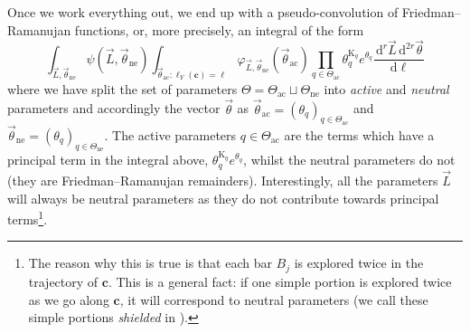 \documentclass[12pt,twoside]{article}
\theoremstyle{theorem}
\theoremstyle{remark}
\theoremstyle{definition}
\theoremstyle{example}
\renewcommand{\d}{\, \mathrm{d}}
\newcommand{\1}[1]{\mathds{1}_{#1}}
\newcommand{\rK}{\mathrm{K}}
\newcommand{\curve}{\mathbf{c}}
\newcommand{\thetaNe}{\vec{\theta}_{\mathrm{ne}}}
\newcommand{\thetaAc}{\vec{\theta}_{\mathrm{ac}}}
\begin{document}
Once we work everything out, we end up with a pseudo-convolution of Friedman--Ramanujan functions,
or, more precisely, an integral of the form
\begin{equation*}
  \int_{\vec{L}, \thetaNe} \psi(\vec{L},\thetaNe)
  \int_{\thetaAc: \ell_Y(\curve)=\ell} \varphi_{\vec{L},\thetaNe}(\thetaAc) \prod_{q \in \Theta_{\mathrm{ac}}} \theta_q^{\rK_q} e^{\theta_q}
  \frac{\d^r \vec{L} \d^{2r} \vec{\theta}}{\d \ell}
\end{equation*}
where we have split the set of parameters
$\Theta = \Theta_{\mathrm{ac}} \sqcup \Theta_{\mathrm{ne}}$ into \emph{active} and \emph{neutral}
parameters and accordingly the vector $\vec{\theta}$ as
$\thetaAc = (\theta_q)_{q \in \Theta_{\mathrm{ac}}}$ and
$\thetaNe = (\theta_q)_{q \in \Theta_{\mathrm{ne}}}$. The active parameters
$q \in \Theta_{\mathrm{ac}}$ are the terms which have a principal term in the integral above,
$\theta_q^{\rK_q}e^{\theta_q}$, whilst the neutral parameters do not (they are Friedman--Ramanujan
remainders). Interestingly, all the parameters $\vec{L}$ will always be neutral parameters as they
do not contribute towards principal terms\footnote{The reason why this is true is that each bar
  $B_j$ is explored twice in the trajectory of $\curve$. This is a general fact: if one simple
  portion is explored twice as we go along $\curve$, it will correspond to neutral parameters (we
  call these simple portions \emph{shielded} in \cite{anantharaman2025}).}.
\end{document}
